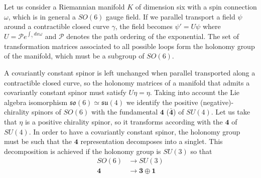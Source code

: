 Let us consider a Riemannian manifold $K$ of dimension six with a spin connection $\omega$, which 
is in general a $SO(6)$ gauge field.
If we parallel transport a field $\psi$ around a contractible closed curve $\gamma$, the field becomes
$\psi'=U\psi$ where $U=\mathcal P e^{\int_\gamma dx \omega}$ and $\mathcal P$ denotes the path ordering of 
the exponential.
The set of transformation matrices associated to all possible loops form the holonomy group of the manifold, 
which must be a subgroup of $SO(6)$.

A covariantly constant spinor is left unchanged when parallel transported along a contractible
closed curve, so the holonomy matrices of a manifold that admits a covariantly constant spinor 
must satisfy $U\eta = \eta$.
Taking into account the Lie algebra isomorphism $\mathfrak{so}(6)\simeq \mathfrak{su}(4)$ we identify the positive
(negative)-chirality spinors of $SO(6)$ with the fundamental $\mathbf 4$ ($\mathbf {\bar 4}$)
of $SU(4)$.
Let us take that $\eta$ is a positive chirality spinor, so it transforms according with the 
$\mathbf 4$ of $SU(4)$.
In order to have a covariantly constant spinor, the holonomy group must be such that the $\mathbf 4$
representation decomposes into a singlet.
This decomposition is achieved if the holonomy group is $SU(3)$ so that
 \begin{align}
  SO(6)  &\to SU(3)\\
  \mathbf 4 &\to \mathbf 3 \oplus \mathbf 1
\end{align} 


